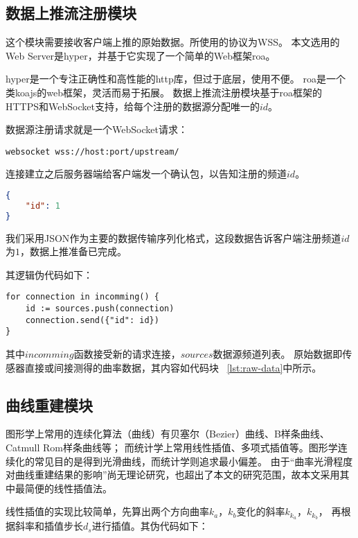 \subsection{数据上推流注册模块}
这个模块需要接收客户端上推的原始数据。所使用的协议为WSS。
本文选用的Web Server是hyper\cite{hyper}，并基于它实现了一个简单的Web框架roa\cite{roa}。

hyper是一个专注正确性和高性能的http库，但过于底层，使用不便。
roa是一个类koajs\cite{koajs}的web框架，灵活而易于拓展。
数据上推流注册模块基于roa框架的HTTPS和WebSocket支持，给每个注册的数据源分配唯一的$id$。

数据源注册请求就是一个WebSocket请求：

\begin{lstlisting}[label={lst:register-source},caption={发起数据源注册请求}]
websocket wss://host:port/upstream/
\end{lstlisting}

连接建立之后服务器端给客户端发一个确认包，以告知注册的频道$id$。

\begin{lstlisting}[language=json,firstnumber=1,label={lst:register-resp},caption={数据源注册成功}]
{
    "id": 1
}
\end{lstlisting}

我们采用JSON\cite{rfc7159}作为主要的数据传输序列化格式，这段数据告诉客户端注册频道$id$为$1$，数据上推准备已完成。

其逻辑伪代码如下：

\begin{lstlisting}[caption={注册数据源}]
for connection in incomming() {
    id := sources.push(connection)
    connection.send({"id": id})
}
\end{lstlisting}

其中$incomming$函数接受新的请求连接，$sources$数据源频道列表。
原始数据即传感器直接或间接测得的曲率数据，其内容如代码块 ~\ref{lst:raw-data}中所示。

\subsection{曲线重建模块}
图形学上常用的连续化算法（曲线）有贝塞尔（Bezier）曲线、B样条曲线、Catmull Rom样条曲线等；
而统计学上常用线性插值、多项式插值等。图形学连续化的常见目的是得到光滑曲线，而统计学则追求最小偏差。
由于“曲率光滑程度对曲线重建结果的影响”尚无理论研究，也超出了本文的研究范围，故本文采用其中最简便的线性插值法。

线性插值的实现比较简单，先算出两个方向曲率$k_a$，$k_b$变化的斜率$k_{k_a}$，$k_{k_b}$，
再根据斜率和插值步长$d_s$进行插值。其伪代码如下：

